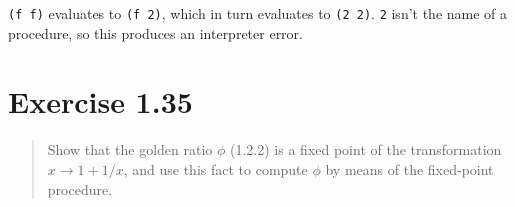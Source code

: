 \documentclass{article}
\begin{document}
\texttt{(f f)} evaluates to \texttt{(f 2)}, which in turn evaluates to
\texttt{(2 2)}. \texttt{2} isn't the name of a procedure, so this produces an
interpreter error.

\section{Exercise 1.35}
\begin{quote}
    Show that the golden ratio $\phi$ (1.2.2) is a fixed point of the
    transformation $x\rightarrow1+1/x$, and use this fact to compute $\phi$ by
    means of the fixed-point procedure.
\end{quote}


\end{document}

